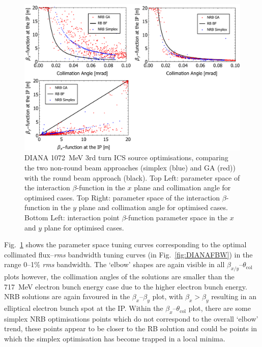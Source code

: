 \documentclass[../main.tex]{subfiles}
\begin{document}
\begin{figure}[!h]
\centering
\includegraphics[width=\textwidth]{Figures/DIANA_Inverse_Compton_Source_Design/DIANA1072param.pdf}
\caption{DIANA 1072~\si{\mega\electronvolt} 3rd turn ICS source optimisations, comparing the two non-round beam approaches (simplex (blue) and GA (red)) with the round beam approach (black). Top Left: parameter space of the interaction $\beta$-function in the $x$ plane and collimation angle for optimised cases. Top Right: parameter space of the interaction $\beta$-function in the $y$ plane and collimation angle for optimised cases. Bottom Left: interaction point $\beta$-function parameter space in the $x$ and $y$ plane for optimised cases.}
\label{fig:DIANA1072_param}
\end{figure}

Fig.~\ref{fig:DIANA1072_param} shows the parameter space tuning curves corresponding to the optimal collimated flux--\textit{rms} bandwidth tuning curves (in Fig.~\ref{fig:DIANAFBW}) in the range 0--1\% \textit{rms} bandwidth. The `elbow' shapes are again visible in all $\beta_{x/y}$--$\theta_{\mathrm{col}}$ plots however, the collimation angles of the solutions are smaller than the 717~\si{\mega\electronvolt} electron bunch energy case due to the higher electron bunch energy. NRB solutions are again favoured in the $\beta_{x}$--$\beta_{y}$ plot, with $\beta_{x}>\beta_{y}$ resulting in an elliptical electron bunch spot at the IP. Within the $\beta_x$--$\theta_{\mathrm{col}}$ plot, there are some simplex NRB optimisations points which do not correspond to the overall `elbow' trend, these points appear to be closer to the RB solution and could be points in which the simplex optimisation has become trapped in a local minima. 
\end{document}
